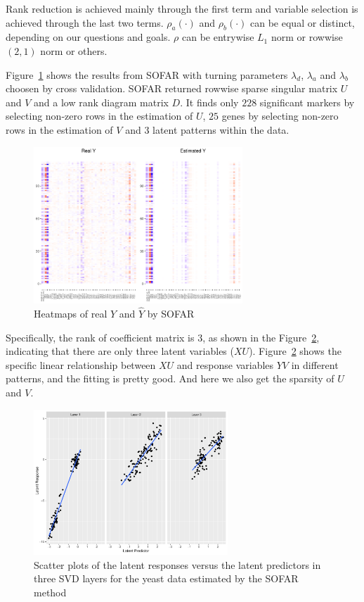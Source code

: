 Rank reduction is achieved mainly through the first term and variable selection is achieved through the last two terms. 
$\rho_a(\cdot)$ and $\rho_b(\cdot)$ can be equal or distinct, depending on our questions and goals. 
$\rho$ can be entrywise $L_1$ norm or rowwise $(2, 1)$ norm or others.

Figure~\ref{fig:heatmapsofar} shows the results from SOFAR with turning parameters $\lambda_{d}$, $\lambda_{a}$ and $\lambda_{b}$ choosen by cross validation. 
SOFAR returned rowwise sparse singular matrix $U$ and $V$ and a low rank diagram matrix $D$. 
It finds only $228$ significant markers by selecting non-zero rows in the estimation of $U$, $25$ genes by selecting non-zero rows in the estimation of $V$ and $3$ latent patterns within the data. 

\begin{figure}[ht]
    \centering
    \includegraphics[width=0.7\textwidth]{./figs/heatmap1.pdf}
    \caption{Heatmaps of real $Y$ and $\hat{Y}$ by SOFAR}
    \label{fig:heatmapsofar}
\end{figure}

Specifically, the rank of coefficient matrix is $3$, as shown in the Figure~\ref{fig:scatter}, indicating that there are only three latent variables ($XU$). 
Figure~\ref{fig:scatter} shows the specific linear relationship between $XU$ and response variables $YV$ in different patterns, and the fitting is pretty good. 
And here we also get the sparsity of $U$ and $V$. 

\begin{figure}[ht]
    \centering
    \includegraphics[width=0.65\textwidth]{./figs/latent1.pdf}
    \caption{Scatter plots of the latent responses versus the latent predictors in three SVD layers for the yeast data estimated by the SOFAR method}
    \label{fig:scatter}
\end{figure}



